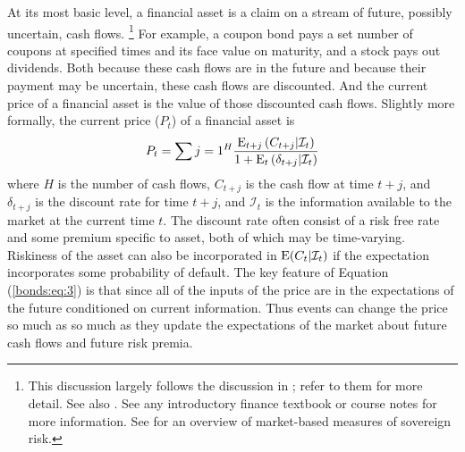 At its most basic level, a financial asset is a claim on a stream of future, possibly uncertain, cash flows.%
\footnote{
  This discussion largely follows the discussion in \textcite[673]{GuidolinLaFerrara2010}; refer to them for more detail.
  See also \textcite{HaberMitchenerOosterlinckEtAl2015}.
  See any introductory finance textbook or course notes for more information.
  See \textcite{Chan-Lau2006} for an overview of market-based measures of sovereign risk.
}
For example, a coupon bond pays a set number of coupons at specified times and its face value on maturity, and a stock pays out dividends.
Both because these cash flows are in the future and because their payment may be uncertain, these cash flows are discounted.
And the current price of a financial asset is the value of those discounted cash flows.
Slightly more formally, the current price ($P_{t}$) of a financial asset is
\begin{equation}
  \label{bonds:eq:3}
  P_{t} = \sum{j = 1}^{H} \frac{\operatorname{E}_{t + j}\left(C_{t + j} | \mathcal{I}_{t}\right)}{1 + \operatorname{E}_{t}\left(\delta_{t+j} | \mathcal{I}_{t}\right)}
\end{equation}
where $H$ is the number of cash flows, $C_{t + j}$ is the cash flow at time $t + j$, and $\delta_{t + j}$ is the discount rate for time $t + j$, and $\mathcal{I}_{t}$ is the information available to the market at the current time $t$.
The discount rate often consist of a risk free rate and some premium specific to asset, both of which may be time-varying.
Riskiness of the asset can also be incorporated in $\operatorname{E}(C_{t}| \mathcal{I}_{t})$ if the expectation incorporates some probability of default.
The key feature of Equation (\ref{bonds:eq:3}) is that since all of the inputs of the price are in the expectations of the future conditioned on current information.
Thus events can change the price so much as so much as they update the expectations of the market about future cash flows and future risk premia.

